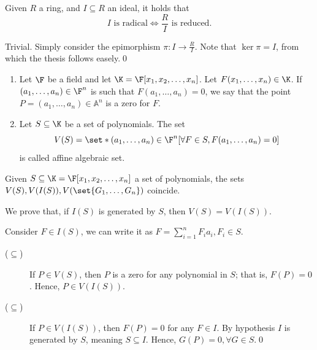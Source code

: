\documentclass{subfiles}
\begin{document}
    \begin{proposition*}
        Given \(R\) a ring, and \(I \subseteq R\) an ideal, it holds that 
        \[
            I \text{ is radical} \iff \frac{R}{I} \text{ is reduced}.
        \]
    \end{proposition*}
    \begin{proof*}
        Trivial. Simply consider the epimorphism \(\pi : I \to \frac{R}{I}\).
            Note that \(\ker{\pi} = I\), from which the thesis follows easely.\qed 
    \end{proof*}

    \begin{definition*}
        \begin{enumerate}
            \item Let \(\F\) be a field and let \(\K = \F[x_{1}, x_{2}, \ldots, x_{n}]\).
                Let \(F(x_{1}, \ldots, x_{n}) \in \K\). 
                If \((a_{1}, \ldots, a_{n}) \in \F^{n}\) is such that \(F(a_{1}, \ldots, a_{n}) = 0\),
                we say that the point \(P = (a_{1}, \ldots, a_{n}) \in \mathbb{A}^{n}\) is a zero for \(F\).

            \item Let \(S \subseteq \K\) be a set of polynomials.
                The set 
                \[
                    V(S) = \set*{(a_{1}, \ldots, a_{n}) \in \F^{n}}[\forall F \in S, F(a_{1}, \ldots, a_{n}) = 0]
                \]
                is called affine algebraic set.
        \end{enumerate}
    \end{definition*}

    \begin{proposition*}
        Given \(S \subseteq \K = \F[x_{1}, x_{2}, \ldots, x_{n}]\) a set of polynomials,
            the sets \(V(S), V(I(S)), V(\set{G_{1}, \ldots, G_{n}})\) coincide.
    \end{proposition*}

    \begin{proof*}
        We prove that, if \(I(S)\) is generated by \(S\), then \(V(S) = V(I(S))\).

        Consider \(F \in I(S)\), we can write it as \(F = \sum_{i = 1}^{n} F_{i}a_{i}, F_{i} \in S\).
        \begin{description}
            \item [(\(\subseteq\))] If \(P \in V(S)\), then \(P\) is a zero for any polynomial
                in \(S\); that is, \(F(P) = 0\). Hence, \(P \in V(I(S))\).
            \item [(\(\subseteq\))] If \(P \in V(I(S))\), then \(F(P) = 0\) for any \(F \in I\).
                By hypothesis \(I\) is generated by \(S\), meaning \(S \subseteq I\).
                Hence, \(G(P) = 0, \forall G \in S\).\qed
        \end{description}
    \end{proof*}
\end{document}
